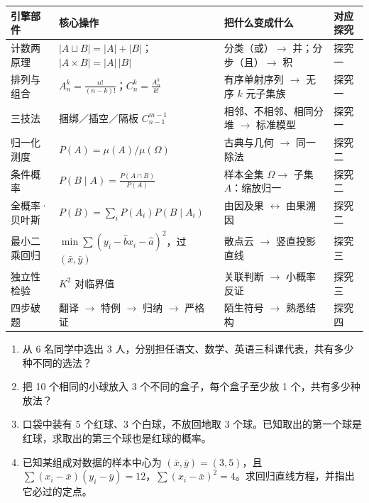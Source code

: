 \begin{explore}
\begin{summary}
\begin{center}
\footnotesize
\setlength{\tabcolsep}{4pt}
\renewcommand{\arraystretch}{1.35}
\begin{tabular}{p{2.5cm}p{4.7cm}p{4.5cm}p{1.4cm}}
\toprule
引擎部件 & 核心操作 & 把什么变成什么 & 对应探究 \\
\midrule
计数两原理 & $|A\sqcup B|=|A|+|B|$；$|A\times B|=|A|\,|B|$ & 分类（或）$\to$ 并；分步（且）$\to$ 积 & 探究一 \\
排列与组合 & $A_n^k=\frac{n!}{(n-k)!}$；$C_n^k=\frac{A_n^k}{k!}$ & 有序单射序列 $\to$ 无序 $k$ 元子集族 & 探究一 \\
三技法 & 捆绑／插空／隔板 $C_{n-1}^{m-1}$ & 相邻、不相邻、相同分堆 $\to$ 标准模型 & 探究一 \\
归一化测度 & $P(A)=\mu(A)/\mu(\Omega)$ & 古典与几何 $\to$ 同一除法 & 探究二 \\
条件概率 & $P(B\mid A)=\frac{P(A\cap B)}{P(A)}$ & 样本全集 $\Omega\to$ 子集 $A$：缩放归一 & 探究二 \\
全概率·贝叶斯 & $P(B)=\sum_iP(A_i)P(B\mid A_i)$ & 由因及果 $\leftrightarrow$ 由果溯因 & 探究二 \\
最小二乘回归 & $\min\sum(y_i-\hat bx_i-\hat a)^2$，过 $(\bar x,\bar y)$ & 散点云 $\to$ 竖直投影直线 & 探究三 \\
独立性检验 & $K^2$ 对临界值 & 关联判断 $\to$ 小概率反证 & 探究三 \\
四步破题 & 翻译 $\to$ 特例 $\to$ 归纳 $\to$ 严格证 & 陌生符号 $\to$ 熟悉结构 & 探究四 \\
\bottomrule
\end{tabular}
\end{center}

\end{summary}

\end{explore}

\begin{inclasstest}
\begin{enumerate}
  \item 从 6 名同学中选出 3 人，分别担任语文、数学、英语三科课代表，共有多少种不同的选法？
  \item 把 10 个相同的小球放入 3 个不同的盒子，每个盒子至少放 1 个，共有多少种放法？
  \item 口袋中装有 5 个红球、3 个白球，不放回地取 3 个球。已知取出的第一个球是红球，求取出的第三个球也是红球的概率。
  \item 已知某组成对数据的样本中心为 $(\bar x,\bar y)=(3,5)$，且 $\sum(x_i-\bar x)(y_i-\bar y)=12$，$\sum(x_i-\bar x)^2=4$。求回归直线方程，并指出它必过的定点。
\end{enumerate}
\end{inclasstest}

